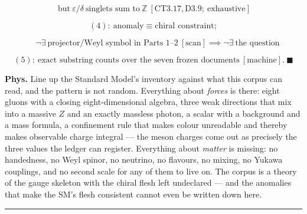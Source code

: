 \begin{theorem}
\[
\ \text{but}\ \varepsilon/\delta\ \text{singlets sum to}\ \mathbb Z\ [\mathrm{CT3.17},\mathrm{D3.9};\ \text{exhaustive}]
\]

\[
(4):\ \text{anomaly}\equiv\text{chiral constraint};
\]

\[
\quad\neg\exists\ \text{projector/Weyl symbol in Parts 1–2}\ [\text{scan}]\implies\neg\exists\ \text{the question}
\]

\[
(5):\ \text{exact substring counts over the seven frozen documents}\ [\text{machine}].\ \blacksquare
\]

\textbf{Phys.} Line up the Standard Model's inventory against what this corpus can read, and the pattern is not random. Everything about \textit{forces} is there: eight gluons with a closing eight-dimensional algebra, three weak directions that mix into a massive $Z$ and an exactly massless photon, a scalar with a background and a mass formula, a confinement rule that makes colour unreadable and thereby makes observable charge integral — the meson charges come out as precisely the three values the ledger can register. Everything about \textit{matter} is missing: no handedness, no Weyl spinor, no neutrino, no flavours, no mixing, no Yukawa couplings, and no second scale for any of them to live on. The corpus is a theory of the gauge skeleton with the chiral flesh left undeclared — and the anomalies that make the SM's flesh consistent cannot even be written down here.

\vspace{2pt}\noindent\rule{\textwidth}{0.4pt}\vspace{2pt}

\end{theorem}

